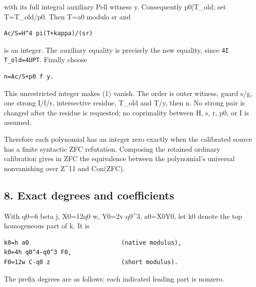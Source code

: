with its full integral auxiliary Pell witness y. Consequently p0|T\_\allowbreak{}old; set T=\allowbreak{}T\_\allowbreak{}old/\allowbreak{}p0. Then T=\allowbreak{}a0 modulo sr and



\begin{verbatim}
Ac/S=H^4 pi(T+kappa)/(sr)
\end{verbatim}

is an integer. The auxiliary equality is precisely the new equality, since \texttt{4I T\_\allowbreak{}old=\allowbreak{}4UPT}. Finally choose



\begin{verbatim}
n=Ac/S+p0 f y.
\end{verbatim}

This unrestricted integer makes (1) vanish. The order is outer witness, guard s/\allowbreak{}g, one strong I/\allowbreak{}f/\allowbreak{}r, intersective residue, T\_\allowbreak{}old and T/\allowbreak{}y, then n. No strong pair is changed after the residue is requested; no coprimality between H, s, r, p0, or I is assumed.



Therefore each polynomial has an integer zero exactly when the calibrated source has a finite syntactic ZFC refutation. Composing the retained ordinary calibration gives in ZFC the equivalence between the polynomial's universal nonvanishing over Z\textasciicircum{}\allowbreak{}11 and Con(ZFC).



\subsection{8. Exact degrees and coefficients}



With q0=\allowbreak{}6 beta j, X0=\allowbreak{}12q0 w, Y0=\allowbreak{}2v q0\textasciicircum{}\allowbreak{}3, a0=\allowbreak{}X0Y0, let k0 denote the top homogeneous part of k. It is



\begin{verbatim}
k0=h a0                          (native modulus),
k0=4h q0^4-q0^3 F0,
F0=12w C-q0 z                    (short modulus).
\end{verbatim}

The prefix degrees are as follows; each indicated leading part is nonzero.



